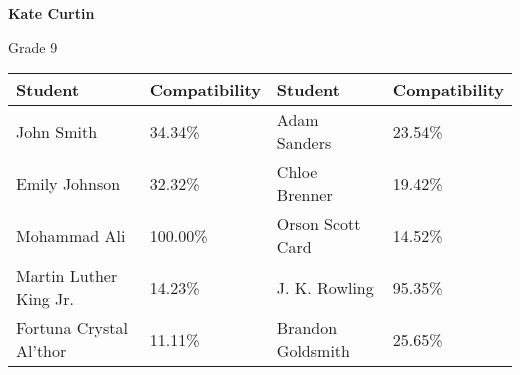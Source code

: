 \documentclass[11pt]{article}
\begin{document}
    \begin{minipage}[b][0.19\textheight][t]{\textwidth}

        \textbf{Kate Curtin}

        Grade 9

        \bigskip

        \begin{tabularx}{\textwidth}{|| Y | Y || Y | Y ||}
            Student & Compatibility & Student & Compatibility \\
            \hline
            John Smith & 34.34\% & Adam Sanders & 23.54\% \\
            Emily Johnson & 32.32\% & Chloe Brenner & 19.42\%  \\
            Mohammad Ali & 100.00\% & Orson Scott Card & 14.52\%  \\
            Martin Luther King Jr. & 14.23\% & J. K. Rowling & 95.35\%  \\
            \raggedright Fortuna Crystal Al'thor & 11.11\% & Brandon Goldsmith & 25.65\%  \\
        \end{tabularx}

    \end{minipage}

    \newpage
\end{document}
